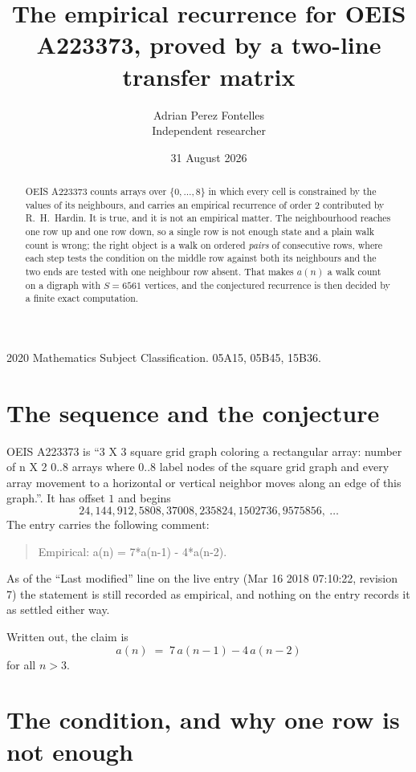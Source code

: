 \documentclass[11pt,a4paper]{article}
\title{The empirical recurrence for OEIS A223373, proved by a two-line transfer matrix}
\author{Adrian Perez Fontelles\\ \small Independent researcher}
\date{31 August 2026}
\theoremstyle{plain}
\theoremstyle{definition}
\begin{document}
\maketitle

\begin{abstract}
OEIS A223373 counts arrays over $\{0,\dots,8\}$ in which every cell is constrained by the
values of its neighbours, and carries an empirical recurrence of order $2$ contributed
by R.~H.~Hardin. It is true, and it is not an empirical matter. The neighbourhood reaches one
row up and one row down, so a single row is not enough state and a plain walk count
is wrong; the right object is a walk on ordered \emph{pairs} of consecutive rows, where
each step tests the condition on the middle row against both its neighbours and the two
ends are tested with one neighbour row absent. That makes $a(n)$ a walk count on a digraph
with $S=6561$ vertices, and the conjectured recurrence is then decided by a finite exact
computation.
\end{abstract}

\noindent\small 2020 Mathematics Subject Classification. 05A15, 05B45, 15B36.\normalsize

\section{The sequence and the conjecture}

OEIS A223373 is ``3 X 3 square grid graph coloring a rectangular array: number of n X 2 0..8 arrays where 0..8 label nodes of the square grid graph and every array movement to a horizontal or vertical neighbor moves along an edge of this graph.''. It has offset $1$ and begins
\[
24, 144, 912, 5808, 37008, 235824, 1502736, 9575856,\ \dots
\]
The entry carries the following comment:
\begin{quote}\small
Empirical: a(n) = 7*a(n-1) - 4*a(n-2).
\end{quote}
As of the ``Last modified'' line on the live entry (Mar 16 2018 07:10:22, revision 7) the statement is
still recorded as empirical, and nothing on the entry records it as settled either way.

Written out, the claim is
\begin{equation}\label{eq:conj}
a(n)\;=\;7\,a(n-1) - 4\,a(n-2)
\end{equation}
for all $n>3$.

\section{The condition, and why one row is not enough}
\end{document}

